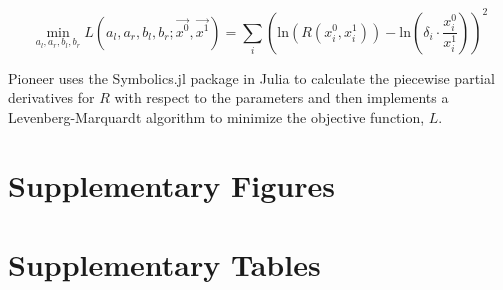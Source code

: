 \documentclass[pdflatex,sn-nature]{sn-jnl}
\begin{document}
\begin{equation}
    \min_{a_l, a_r, b_l, b_r} L(a_l, a_r, b_l, b_r; \vec{x^0}, \vec{x^1}) = \sum_i \left(\text{ln}\left(R(x_i^0, x_i^1)\right) - \text{ln}\left(\delta_i \cdot \frac{x_{i}^{0}}{x_{i}^{1}}\right)\right)^2
\end{equation}

Pioneer uses the Symbolics.jl package in Julia to calculate the piecewise partial derivatives for $R$ with respect to the parameters and then implements a Levenberg-Marquardt algorithm to minimize the objective function, $L$. 

















\section{Supplementary Figures}\label{sec:supplementary-figures}








\section{Supplementary Tables}\label{sec:supplementary-tables}


\end{document}
